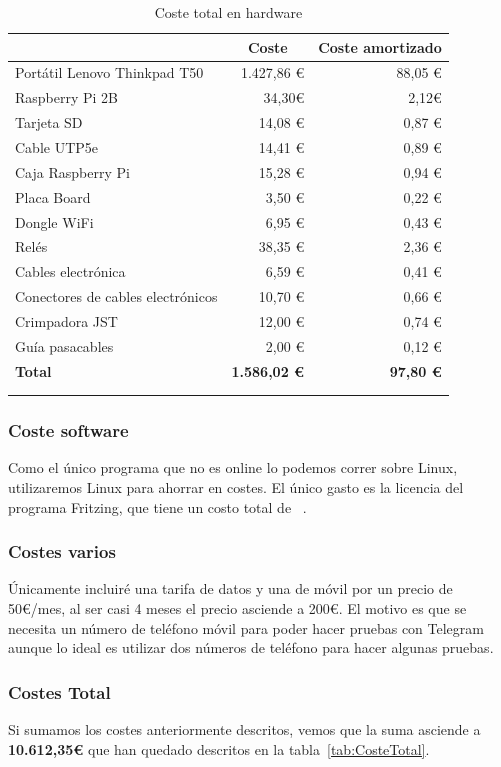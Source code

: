 \begin{longtable}[c]{@{}lrr@{}}
\toprule
\centering
\multicolumn{1}{c}{\textbf{Concepto}} & \multicolumn{1}{c}{\textbf{Coste}} & \multicolumn{1}{c}{\textbf{Coste amortizado}} \\* \midrule
\endfirsthead
%
\endhead
%
\bottomrule
\endfoot
%
\endlastfoot
%
Portátil Lenovo Thinkpad T50 & 1.427,86 € & 88,05 € \\
Raspberry Pi 2B & 34,30€ & 2,12€ \\
Tarjeta SD & 14,08 € & 0,87 € \\
Cable UTP5e & 14,41 € & 0,89 € \\
Caja Raspberry Pi & 15,28 € & 0,94 € \\
Placa Board & 3,50 € & 0,22 € \\
Dongle WiFi & 6,95 € & 0,43 € \\
Relés & 38,35 € & 2,36 € \\
Cables electrónica & 6,59 € & 0,41 € \\
Conectores de cables electrónicos & 10,70 € & 0,66 € \\
Crimpadora JST & 12,00 € & 0,74 € \\
Guía pasacables & 2,00 € & 0,12 € \\ \midrule
\textbf{Total} & \textbf{1.586,02 €} & \textbf{97,80 €} \\ \bottomrule \\
\caption{Coste total en hardware}
\label{tab:CosteHW}
\end{longtable}

\subsubsection{Coste software}
Como el único programa que no es online lo podemos correr sobre Linux, utilizaremos Linux para ahorrar en costes. El único gasto es la licencia del programa Fritzing, que tiene un costo total de ~\cite{misc:Fritzing}.

\subsubsection{Costes varios}
Únicamente incluiré una tarifa de datos y una de móvil por un precio de 50€/mes, al ser casi 4 meses el precio asciende a 200€.
El motivo es que se necesita un número de teléfono móvil para poder hacer pruebas con Telegram aunque lo ideal es utilizar dos números de teléfono para hacer algunas pruebas.

\subsubsection{Costes Total}
Si sumamos los costes anteriormente descritos, vemos que la suma asciende a \textbf{10.612,35€} que han quedado descritos en la tabla~\ref{tab:CosteTotal}.

